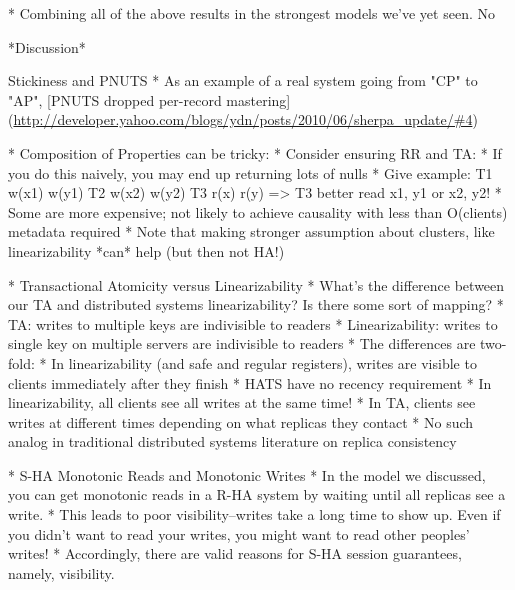 * Combining all of the above results in the strongest models we've yet seen. No

*Discussion*

Stickiness and PNUTS
* As an example of a real system going from "CP" to "AP", [PNUTS dropped per-record mastering](\url{http://developer.yahoo.com/blogs/ydn/posts/2010/06/sherpa_update/#4})


* Composition of Properties can be tricky:
	* Consider ensuring RR and TA:
		* If you do this naively, you may end up returning lots of nulls
		* Give example: T1 w(x1) w(y1) T2 w(x2) w(y2) T3 r(x) r(y) => T3 better read x1, y1 or x2, y2!
	* Some are more expensive; not likely to achieve causality with less than O(clients) metadata required
		* Note that making stronger assumption about clusters, like linearizability *can* help (but then not HA!)

* Transactional Atomicity versus Linearizability
	* What's the difference between our TA and distributed systems linearizability? Is there some sort of mapping?
		* TA: writes to multiple keys are indivisible to readers
		* Linearizability: writes to single key on multiple servers are indivisible to readers
	* The differences are two-fold:
		* In linearizability (and safe and regular registers), writes are visible to clients immediately after they finish
			* HATS have no recency requirement
		* In linearizability, all clients see all writes at the same time!
			* In TA, clients see writes at different times depending on what replicas they contact
			* No such analog in traditional distributed systems literature on replica consistency
	
* S-HA Monotonic Reads and Monotonic Writes
	* In the model we discussed, you can get monotonic reads in a R-HA system by waiting until all replicas see a write.
	* This leads to poor visibility--writes take a long time to show up. Even if you didn't want to read your writes, you might want to read other peoples' writes!
	* Accordingly, there are valid reasons for S-HA session guarantees, namely, visibility.
